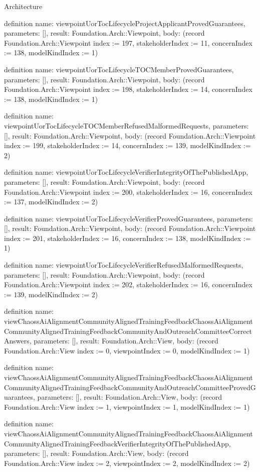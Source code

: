 \begin{lexlean}{Architecture}
\begin{semanticmodule}
definition{
  name: viewpointUorTocLifecycleProjectApplicantProvedGuarantees,
  parameters: [],
  result: Foundation.Arch::Viewpoint,
  body: (record Foundation.Arch::Viewpoint {index := 197, stakeholderIndex := 11, concernIndex := 138, modelKindIndex := 1})
}

definition{
  name: viewpointUorTocLifecycleTOCMemberProvedGuarantees,
  parameters: [],
  result: Foundation.Arch::Viewpoint,
  body: (record Foundation.Arch::Viewpoint {index := 198, stakeholderIndex := 14, concernIndex := 138, modelKindIndex := 1})
}

definition{
  name: viewpointUorTocLifecycleTOCMemberRefusedMalformedRequests,
  parameters: [],
  result: Foundation.Arch::Viewpoint,
  body: (record Foundation.Arch::Viewpoint {index := 199, stakeholderIndex := 14, concernIndex := 139, modelKindIndex := 2})
}

definition{
  name: viewpointUorTocLifecycleVerifierIntegrityOfThePublishedApp,
  parameters: [],
  result: Foundation.Arch::Viewpoint,
  body: (record Foundation.Arch::Viewpoint {index := 200, stakeholderIndex := 16, concernIndex := 137, modelKindIndex := 2})
}

definition{
  name: viewpointUorTocLifecycleVerifierProvedGuarantees,
  parameters: [],
  result: Foundation.Arch::Viewpoint,
  body: (record Foundation.Arch::Viewpoint {index := 201, stakeholderIndex := 16, concernIndex := 138, modelKindIndex := 1})
}

definition{
  name: viewpointUorTocLifecycleVerifierRefusedMalformedRequests,
  parameters: [],
  result: Foundation.Arch::Viewpoint,
  body: (record Foundation.Arch::Viewpoint {index := 202, stakeholderIndex := 16, concernIndex := 139, modelKindIndex := 2})
}

definition{
  name: viewChaossAiAlignmentCommunityAlignedTrainingFeedbackChaossAiAlignmentCommunityAlignedTrainingFeedbackCommunityAndOutreachCommitteeCorrectAnswers,
  parameters: [],
  result: Foundation.Arch::View,
  body: (record Foundation.Arch::View {index := 0, viewpointIndex := 0, modelKindIndex := 1})
}

definition{
  name: viewChaossAiAlignmentCommunityAlignedTrainingFeedbackChaossAiAlignmentCommunityAlignedTrainingFeedbackCommunityAndOutreachCommitteeProvedGuarantees,
  parameters: [],
  result: Foundation.Arch::View,
  body: (record Foundation.Arch::View {index := 1, viewpointIndex := 1, modelKindIndex := 1})
}

definition{
  name: viewChaossAiAlignmentCommunityAlignedTrainingFeedbackChaossAiAlignmentCommunityAlignedTrainingFeedbackVerifierIntegrityOfThePublishedApp,
  parameters: [],
  result: Foundation.Arch::View,
  body: (record Foundation.Arch::View {index := 2, viewpointIndex := 2, modelKindIndex := 2})
}


\end{semanticmodule}
\end{lexlean}
